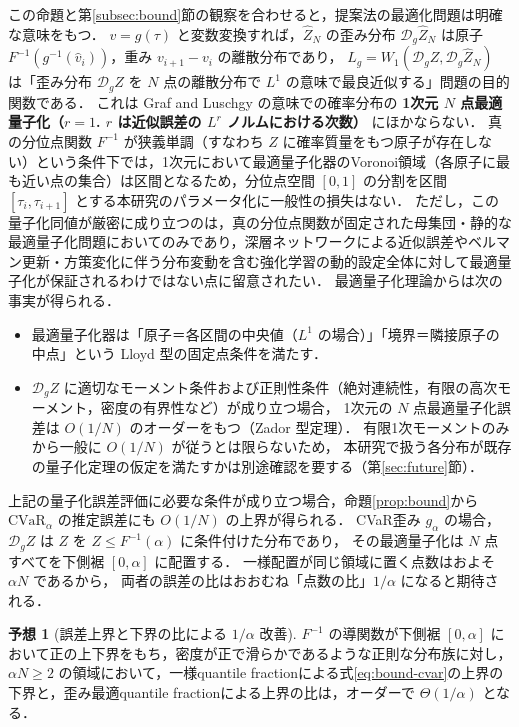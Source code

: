 \documentclass[a4paper,10pt]{jsarticle}
\theoremstyle{definition}
\newtheorem{conjecture}{予想}[section]
\newcommand{\CVaR}{\mathrm{CVaR}}
\newcommand{\Wone}{W_1}
\newcommand{\Finv}{F^{-1}}
\newcommand{\dist}{\mathcal{D}_g}
\begin{document}
この命題と第\ref{subsec:bound}節の観察を合わせると，提案法の最適化問題は明確な意味をもつ．
$v=g(\tau)$ と変数変換すれば，$\hat Z_N$ の歪み分布 $\dist\hat Z_N$ は原子 $\Finv(g^{-1}(\hat v_i))$，重み $v_{i+1}-v_i$ の離散分布であり，
$L_g=\Wone(\dist Z,\dist\hat Z_N)$ は「歪み分布 $\dist Z$ を $N$ 点の離散分布で $L^1$ の意味で最良近似する」問題の目的関数である．
これは Graf and Luschgy \cite{graf2000quantization} の意味での確率分布の \textbf{1次元 $N$ 点最適量子化（$r=1$. $r$ は近似誤差の $L^r$ ノルムにおける次数）} にほかならない．
真の分位点関数 $\Finv$ が狭義単調（すなわち $Z$ に確率質量をもつ原子が存在しない）という条件下では，1次元において最適量子化器のVoronoi領域（各原子に最も近い点の集合）は区間となるため，分位点空間 $[0,1]$ の分割を区間 $[\tau_i,\tau_{i+1}]$ とする本研究のパラメータ化に一般性の損失はない．
ただし，この量子化同値が厳密に成り立つのは，真の分位点関数が固定された母集団・静的な最適量子化問題においてのみであり，深層ネットワークによる近似誤差やベルマン更新・方策変化に伴う分布変動を含む強化学習の動的設定全体に対して最適量子化が保証されるわけではない点に留意されたい．
最適量子化理論からは次の事実が得られる．
\begin{itemize}
  \item 最適量子化器は「原子＝各区間の中央値（$L^1$ の場合）」「境界＝隣接原子の中点」という Lloyd 型の固定点条件を満たす．
  \item $\dist Z$ に適切なモーメント条件および正則性条件（絶対連続性，有限の高次モーメント，密度の有界性など）が成り立つ場合，
  1次元の $N$ 点最適量子化誤差は $O(1/N)$ のオーダーをもつ（Zador 型定理）．
  有限1次モーメントのみから一般に $O(1/N)$ が従うとは限らないため，
  本研究で扱う各分布が既存の量子化定理の仮定を満たすかは別途確認を要する（第\ref{sec:future}節）．
\end{itemize}
上記の量子化誤差評価に必要な条件が成り立つ場合，命題\ref{prop:bound}から $\CVaR_\alpha$ の推定誤差にも $O(1/N)$ の上界が得られる．
CVaR歪み $g_\alpha$ の場合，$\dist Z$ は $Z$ を $Z\le\Finv(\alpha)$ に条件付けた分布であり，
その最適量子化は $N$ 点すべてを下側裾 $[0,\alpha]$ に配置する．
一様配置が同じ領域に置く点数はおよそ $\alpha N$ であるから，
両者の誤差の比はおおむね「点数の比」$1/\alpha$ になると期待される．
\begin{conjecture}[誤差上界と下界の比による $1/\alpha$ 改善]
\label{conj:alpha}
$\Finv$ の導関数が下側裾 $[0,\alpha]$ において正の上下界をもち，密度が正で滑らかであるような正則な分布族に対し，$\alpha N\ge2$ の領域において，一様quantile fractionによる式\eqref{eq:bound-cvar}の上界の下界と，歪み最適quantile fractionによる上界の比は，オーダーで $\Theta(1/\alpha)$ となる．
\end{conjecture}
\end{document}
